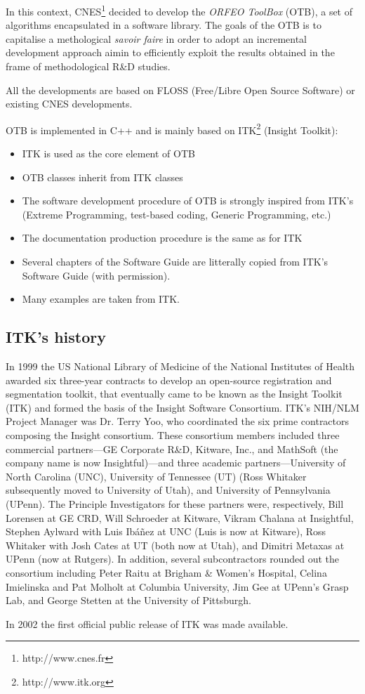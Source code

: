 In this context, CNES\footnote{http://www.cnes.fr} decided to develop
the \emph{ORFEO ToolBox} (OTB), a set of algorithms encapsulated in a
software library. The goals of the OTB is to capitalise a methological
\textit{savoir faire} in order to adopt an incremental development
approach aimin to efficiently exploit the results obtained in the
frame of methodological R\&D studies.

All the developments are based on FLOSS (Free/Libre Open Source
Software) or existing CNES developments.

OTB is implemented in C++ and is mainly based on
ITK\footnote{http://www.itk.org} (Insight Toolkit):
\begin{itemize}
  \item ITK is used as the core element of OTB
  \item OTB classes inherit from ITK classes
  \item The software development procedure of OTB is strongly inspired
  from ITK's (Extreme Programming, test-based coding, Generic
  Programming, etc.)
  \item The documentation production procedure is the same as for ITK
  \item Several chapters of the Software Guide are litterally copied
  from ITK's Software Guide (with permission).
  \item Many examples are taken from ITK.
\end{itemize}

\subsection{ITK's history}

In 1999 the US National Library of Medicine of the National Institutes of
Health awarded six three-year contracts to develop an open-source
registration and segmentation toolkit, that eventually came to be known as
the Insight Toolkit (ITK) and formed the basis of the Insight Software
Consortium. ITK's NIH/NLM Project Manager was Dr. Terry Yoo, who coordinated the
six prime contractors composing the Insight consortium. These consortium
members included three commercial partners---GE Corporate R\&D, Kitware,
Inc., and MathSoft (the company name is now Insightful)---and three academic
partners---University of North Carolina (UNC), University of Tennessee (UT)
(Ross Whitaker subsequently moved to University of Utah), and University of
Pennsylvania (UPenn). The Principle Investigators for these partners were,
respectively, Bill Lorensen at GE CRD, Will Schroeder at Kitware, Vikram
Chalana at Insightful, Stephen Aylward with Luis Ib\'a\~nez at UNC (Luis is now
at Kitware), Ross Whitaker with Josh Cates at UT (both now at Utah), and
Dimitri Metaxas at UPenn (now at Rutgers). In addition, several
subcontractors rounded out the consortium including Peter Raitu at Brigham \&
Women's Hospital, Celina Imielinska and Pat Molholt at Columbia University,
Jim Gee at UPenn's Grasp Lab, and George Stetten at the University of
Pittsburgh.

In 2002 the first official public release of ITK was made
available.




